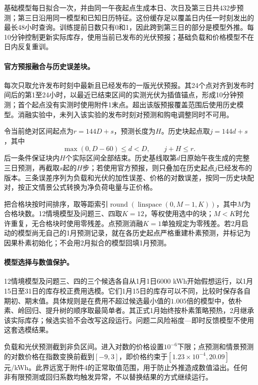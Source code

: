 基础模型每日拟合一次，并由同一午夜起点生成本日、次日及第三日共432步预测；第三日沿用同一模型和已知日历特征。这份缓存足以覆盖日内任一时刻发出的最长48小时查询。训练提前日数只有0和1，因此跨到第三日的部分是模型外推。每10分钟控制更新实际库存，使用当前已发布的光伏预报；基础负载和价格模型不在日内反复重训。

\paragraph{官方预报融合与历史误差块。}
每次只取允许发布时刻中最新且已经发布的一版光伏预报。其24个点对齐到发布时间后的第1至24小时，以最近已结束区间的实测光伏为插值锚点，形成10分钟预测；首个起点没有实测时使用附件1末点。超出该版预报覆盖范围后使用历史模型。消融实验中，未列入该实验的发布时刻对预测和购电调整同时不可用。

令当前绝对区间起点为$r=144D+s$，预测长度为$H$。历史块起点取$j=144d+s$，其中
\begin{equation}
 \max(0,D-60)\le d<D,\qquad j+H\le r.
\end{equation}
后一条件保证块内$H$个实际区间全部结束。历史基线取第$d$日原始午夜生成的完整三日预测，再截取$s$起的$H$步；若使用官方预报，则只叠加在历史起点$j$已经发布的版本。三条误差序列为负载和光伏的加性误差、价格的对数误差，按同一历史块配对，按正文情景公式转换为净负荷电量与正价格。

把合格块按时间排序，取等距索引$\operatorname{round}(\operatorname{linspace}(0,M-1,K))$，其中$M$为合格块数。12情境模型及问题三、四取$K=12$，等权使用选中的块；$M<K$时允许重复，无合格块时使用零残差。点预测消融$K=1$单独规定为零残差。若2月启动的模型尚无自己的1月预测记录，就在各历史起点严格重建朴素预测，并标记为因果朴素初始化；不会用2月拟合的模型回填1月预测。

\paragraph{模型选择与数值保护。}
12情境模型及问题三、四的三个候选各自从1月1日6000 kWh开始假想运行，以1月15日至31日的库存校正费用选模。它们1月15日的库存可以不同，比较时保存各自期初、期末值。具体规则是在费用不超过候选最小值的$1.005$倍的模型中，依朴素、岭回归、提升树的顺序取最简单者。其正式1月始终按朴素策略预热，2月继承该实际库存；候选实验不会改写这段运行。问题二风险裕度—即时反馈模型不使用这套选模结果。

负载和光伏预测截到非负区间。进入对数的价格设置$10^{-6}$下限；点预测和情景预测的对数价格在指数变换前截到$[-9,3]$，即价格约束于$[1.23\times10^{-4},20.09]$元/kWh。此界远宽于附件4的正常取值范围，用于防止外推造成数值溢出。任何非有限预测或回归系数均触发异常，不以替换结果的方式继续运行。

